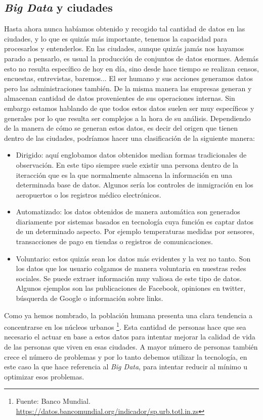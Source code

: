 \subsection{\emph{Big Data} y ciudades}
Hasta ahora nunca habíamos obtenido y recogido tal cantidad de datos en las ciudades, y lo que es quizás más importante, tenemos la capacidad para procesarlos y entenderlos. En las ciudades, aunque quizás jamás nos hayamos parado a pensarlo, es usual la producción de conjuntos de datos enormes. Además esto no resulta específico de hoy en día, sino desde hace tiempo se realizan censos, encuestas, entrevistas, baremos... El ser humano y sus acciones generamos datos pero las administraciones también. De la misma manera las empresas generan y almacenan cantidad de datos provenientes de sus operaciones internas. Sin embargo estamos hablando de que todos estos datos suelen ser muy específicos y generales por lo que resulta ser complejos a la hora de su análisis. Dependiendo de la manera de cómo se generan estos datos, es decir del origen que tienen dentro de las ciudades, podríamos hacer una clasificación de la siguiente manera:


\begin{itemize}
	\item Dirigido: aquí englobamos datos obtenidos median formas tradicionales de observación. En este tipo siempre suele existir una persona dentro de la iteracción que es la que normalmente almacena la información en una determinada base de datos. Algunos sería los controles de inmigración en los aeropuertos o los registros médico electrónicos.
	\item Automatizado: los datos obtenidos de manera automática son generados diariamente por sistemas basados en tecnología cuya función es captar datos de un determinado aspecto. Por ejemplo temperaturas medidas por sensores, transacciones de pago en tiendas o registros de comunicaciones.
	\item Voluntario: estos quizás sean los datos más evidentes y la vez no tanto. Son los datos que los usuario colgamos de manera voluntaria en nuestras redes sociales. Se puede extraer información muy valiosa de este tipo de datos. Algunos ejemplos son las publicaciones de Facebook, opiniones en twitter, búsquerda de Google o información sobre links. 
\end{itemize}


 Como ya hemos nombrado, la población humana presenta una clara tendencia a concentrarse en los núcleos urbanos \footnote{Fuente: Banco Mundial. \url{https://datos.bancomundial.org/indicador/sp.urb.totl.in.zs}}. Esta cantidad de personas hace que sea necesario el actuar en base a estos datos para intentar mejorar la calidad de vida de las personas que viven en esas ciudades. A mayor número de personas también crece el número de problemas y por lo tanto debemos utilizar la tecnología, en este caso la que hace referencia al \textit{Big Data}, para intentar reducir al mínimo u optimizar esos problemas. 
 
